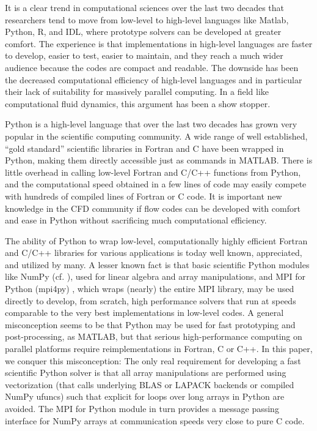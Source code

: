 \documentclass[final,3p,times,twocolumn]{elsarticle}
\begin{document}
It is a clear trend in computational sciences over the last two decades
that researchers tend to move from low-level to high-level languages
like Matlab, Python, R, and IDL, where prototype solvers can be developed at 
greater comfort. The experience is that implementations
in high-level languages are faster to develop, easier to test,
easier to maintain, and they reach a much wider audience because the codes are 
compact and readable. The downside has been the decreased computational
efficiency of high-level languages and in particular their lack of
suitability for massively parallel computing. In a field like computational
fluid dynamics, this argument has been a show stopper. 



Python is a high-level language that over the last two decades has grown very 
popular in the scientific computing community. A wide range of well 
established, ``gold standard'' scientific libraries in Fortran and C have been 
wrapped in Python, making them directly accessible just as commands in MATLAB. 
There is little overhead in calling low-level Fortran and C/C++ functions from 
Python, and the computational speed obtained in a few lines of code may easily 
compete with hundreds of compiled lines of Fortran or C code. It is important 
new knowledge in the CFD community if flow codes can be developed with comfort 
and ease in Python without sacrificing much computational efficiency.

The ability of Python to wrap low-level, computationally highly efficient 
Fortran and C/C++ libraries for various applications is today well known, 
appreciated, and utilized by many. A lesser known fact is that basic scientific 
Python modules like NumPy (cf. \cite{numpy, van2011numpy}), used for linear 
algebra and array manipulations, and MPI for Python (mpi4py) \cite{mpi4py}, 
which wraps (nearly) the entire MPI library, may be used directly to develop, 
from scratch, 
high performance solvers that run at speeds comparable to the very best 
implementations in low-level codes. A general misconception seems to be that 
Python may be used for fast prototyping and post-processing, as MATLAB, but 
that serious high-performance computing on parallel platforms require 
reimplementations in Fortran, C or C++. In this paper, we conquer this 
misconception: The only real requirement for developing a fast scientific 
Python solver is that all array manipulations are 
performed using vectorization (that calls underlying BLAS or LAPACK backends or 
compiled NumPy ufuncs) such that explicit for loops over long arrays in Python 
are avoided. The MPI for Python module in turn provides a message passing 
interface for NumPy arrays at communication speeds very close to pure 
C code.
\end{document}
